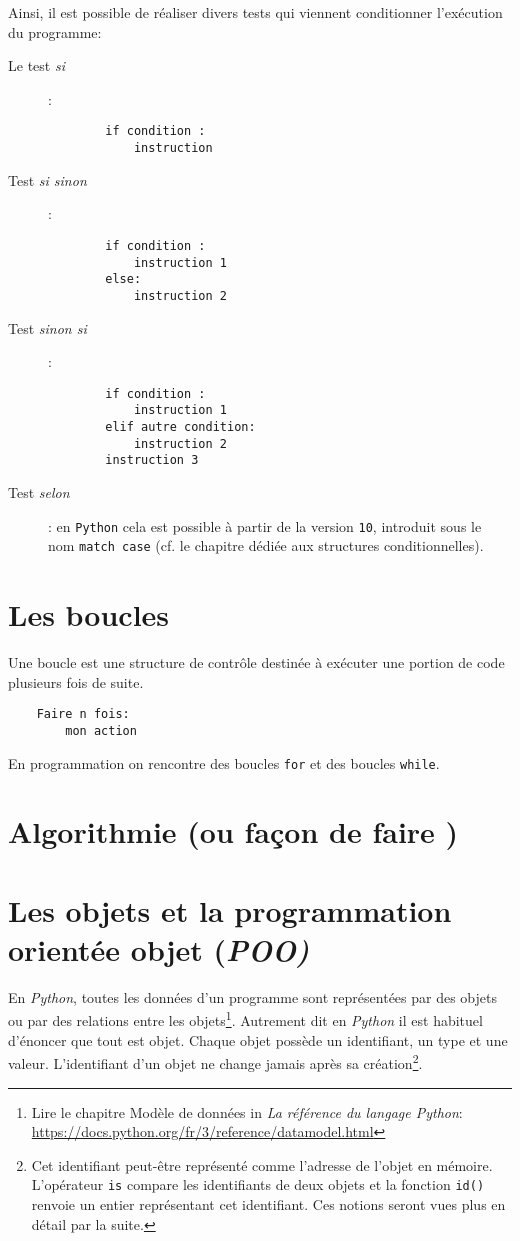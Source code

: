 Ainsi, il est possible de réaliser divers tests qui viennent conditionner l'exécution du programme:
\begin{description}
	\item[Le test \og \textit{si} \fg{}]:
	\begin{verbatim}
	    if condition : 
	        instruction
	\end{verbatim}
	\item[Test \og \textit{si sinon} \fg{}]:
	\begin{verbatim}
	    if condition : 
	        instruction 1
	    else:
	        instruction 2
	\end{verbatim}
	\item[Test \og \textit{sinon si} \fg{}]:
	\begin{verbatim}
	    if condition : 
	        instruction 1
	    elif autre condition:
	        instruction 2
	    instruction 3
	 \end{verbatim}
	 \item[Test \og \textit{selon} \fg{}]: en \texttt{Python} cela est possible à partir de la version \texttt{10}, introduit sous le nom \texttt{match case} (cf. le chapitre dédiée aux structures conditionnelles).
\end{description} 

\section{Les boucles}
Une boucle est une structure de contrôle destinée à exécuter une portion de code plusieurs fois de suite.
\begin{verbatim}
    Faire n fois:
        mon action
\end{verbatim}
\medskip

En programmation on rencontre des boucles \texttt{for} et des boucles \texttt{while}.
\bigskip

\section{Algorithmie (ou \og façon de faire \fg{})}
\medskip

\section{Les objets et la programmation orientée objet (\textit{POO)}}
\medskip
En \textit{Python}, toutes les données d'un programme sont représentées par des objets ou par des relations entre les objets\footnote{Lire le chapitre \og Modèle de données\fg{} in \og  \textit{La référence du langage Python}\fg{}: \url{https://docs.python.org/fr/3/reference/datamodel.html}}. Autrement dit en \textit{Python} il est habituel d'énoncer que tout est objet. Chaque objet possède un identifiant, un type et une valeur. L'identifiant d'un objet ne change jamais après sa création\footnote{Cet identifiant peut-être représenté comme l'adresse de l'objet en mémoire. L'opérateur \texttt{is} compare les identifiants de deux objets et la fonction \texttt{id()} renvoie un entier représentant cet identifiant. Ces notions seront vues plus en détail par la suite.}.
\medskip

